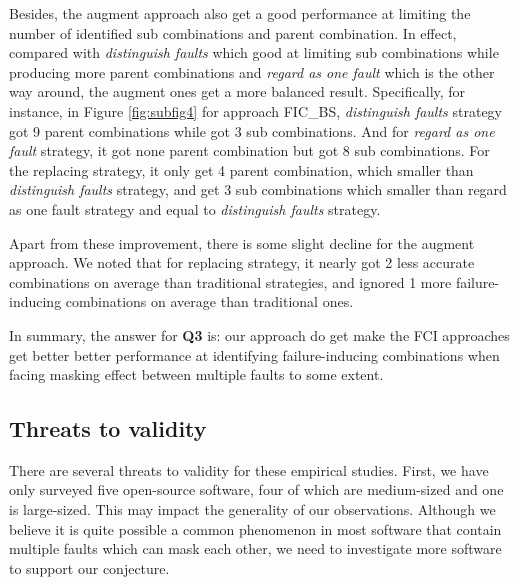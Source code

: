\documentclass{sig-alternate}
\begin{document}
Besides, the augment approach also get a good performance at limiting the number of identified sub combinations and parent combination. In effect, compared with \emph{distinguish faults} which good at limiting sub combinations while producing more parent combinations and \emph{regard as one fault} which is the other way around, the augment ones get a more balanced result. Specifically, for instance, in Figure \ref{fig:subfig4} for approach FIC\_BS, \emph{distinguish faults} strategy got 9 parent combinations while got 3 sub combinations. And for \emph{regard as one fault} strategy, it got none parent combination but got 8 sub combinations. For the replacing strategy, it only get 4 parent combination, which smaller than \emph{distinguish faults} strategy, and get 3 sub combinations which smaller than regard as one fault strategy and equal to \emph{distinguish faults} strategy.

Apart from these improvement, there is some slight decline for the augment approach. We noted that for replacing strategy, it nearly got 2 less accurate combinations on average than traditional strategies, and ignored 1 more failure-inducing combinations on average than traditional ones.


In summary, the answer for \textbf{Q3} is: our approach do get make the FCI approaches get better better performance at identifying failure-inducing combinations when facing masking effect between multiple faults to some extent.

\subsection{Threats to validity}
There are several threats to validity for these empirical studies. First, we have only surveyed five open-source software, four of which are medium-sized and one is large-sized. This may impact the generality of our observations. Although we believe it is quite possible a common phenomenon in most software that contain multiple faults which can mask each other, we need to investigate more software to support our conjecture.
\end{document}
